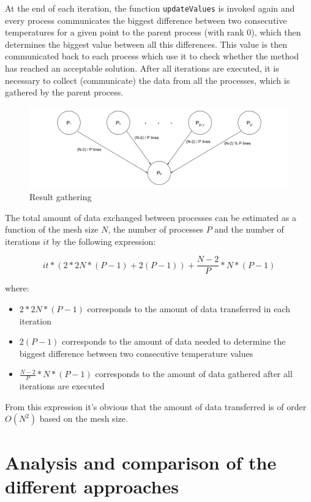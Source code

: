 \documentclass{article}
\begin{document}
At the end of each iteration, the function \texttt{updateValues} is invoked again and every process communicates the biggest difference 
between two consecutive temperatures for a given point to the parent process (with rank 0), which then determines the biggest value
between all this differences. This value is then communicated back to each process which use it to check whether the method has reached an 
acceptable solution. After all iterations are executed, it is necessary to collect (communicate) the data from all the processes, which 
is gathered by the parent process. 

\begin{figure}[H]
    \centering
    \includegraphics[width=13cm]{Pictures/FinalCommunication.png}
    \caption{Result gathering}
    \label{fig:commuLines}
\end{figure}

The total amount of data exchanged between processes can be estimated as a function of the mesh size $N$, the number of processes $P$ 
and the number of iterations $it$ by the following expression:

$$ it * ( 2*2N*(P-1) + 2(P-1) ) + \frac{N-2}{P}*N*(P-1)$$

where:

\begin{itemize}
    \item $2*2N*(P-1)$ corresponds to the amount of data transferred in each iteration
    \item $2(P-1)$ corresponds to the amount of data needed to determine the biggest difference between two consecutive temperature values
    \item $\frac{N-2}{P}*N*(P-1)$ corresponds to the amount of data gathered after all iterations are executed
\end{itemize}

From this expression it's obvious that the amount of data transferred is of order $O(N^2)$ based on the mesh size.

\newpage

\section{Analysis and comparison of the different approaches}
\end{document}
